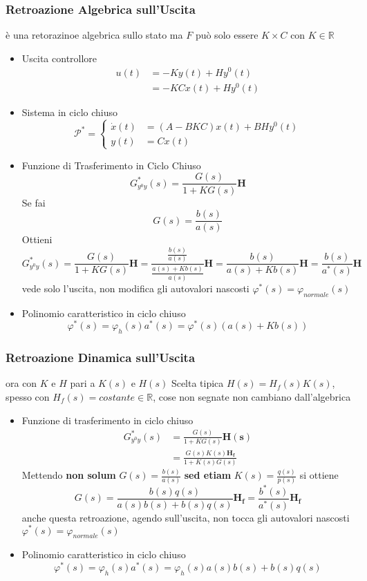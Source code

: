 \documentclass{article}
\begin{document}
\subsubsection{Retroazione Algebrica sull'Uscita}
è una retorazinoe algebrica sullo stato ma $F$ può solo essere
$K \times C$ con $K \in \mathbb{R}$
\begin{itemize}
\item Uscita controllore
  \begin{align*}
    u(t) &= -Ky(t) + H y^0 (t) \\
    &= -KCx(t) + Hy^0 (t)
  \end{align*}
\item Sistema in ciclo chiuso
  \[ \mathcal{P}^{\ast} = \begin{cases}
    \dot{x}(t) &= (A-BKC)x(t) + BHy^0 (t) \\
    y(t) &= Cx(t)
  \end{cases} \]
\item Funzione di Trasferimento in Ciclo Chiuso
  \[ G^{\ast} _{y^0 y} (s) = \frac{G(s)}{1+ KG(s)} \mathbf{H}\]
  Se fai
  \[ G(s) = \frac{b(s)}{a(s)} \]
  Ottieni
  \[ G^{\ast} _{y^0 y} (s)
  = \frac{G(s)}{1+KG(s)} \mathbf{H}
  = \frac{\frac{b(s)}{a(s)}}{\frac{a(s) + Kb(s)}{a(s)}} \mathbf{H}
  = \frac{b(s)}{a(s) + Kb(s)} \mathbf{H}
  = \frac{b(s)}{a^{\ast}(s)} \mathbf{H}\]
  vede solo l'uscita, non modifica gli autovalori nascosti
  $\varphi ^{\ast} (s) = \varphi_{normale} (s)$ \item Polinomio caratteristico in ciclo chiuso
  \[ \varphi ^{\ast} (s) = \varphi_{h} (s) a^{\ast} (s)
  = \varphi ^{\ast} (s) (a(s) + Kb(s)) \]
\end{itemize}

\subsubsection{Retroazione Dinamica sull'Uscita}
ora con $K$ e $H$ pari a $K(s)$ e $H(s)$
Scelta tipica $H(s) = H_f (s) K(s)$, spesso con
$H_f (s) = costante \in \mathbb{R}$, cose non segnate non cambiano
dall'algebrica

\begin{itemize}
\item Funzione di trasferimento in ciclo chiuso
  \begin{align*}
    G^{\ast} _{y^0 y}(s) &= \frac{G(s)}{1 + KG(s)} \mathbf{H(s)} \\
    &= \frac{G(s)K(s) \mathbf{H_f}}{1 + K(s)G(s)}
  \end{align*}
  Mettendo \textbf{non solum}
  $G(s) = \frac{b(s)}{a(s)}$ \textbf{sed etiam}
  $K(s) = \frac{q(s)}{p(s)}$ si ottiene
  \[ G(s) = \frac{b(s)q(s)}{a(s)b(s) + b(s)q(s)} \mathbf{H_f} =
  \frac{b^{\ast}(s)}{a^{\ast}(s)} \mathbf{H_f} \]
  anche questa retroazione, agendo sull'uscita, non tocca gli autovalori nascosti
  $\varphi ^{\ast} (s) = \varphi_{normale} (s)$
\item Polinomio caratteristico in ciclo chiuso
  \[ \varphi ^{\ast} (s) = \varphi_h (s) a^{\ast} (s)
  = \varphi _h (s) a(s)b(s) + b(s)q(s) \]
\end{itemize}
\end{document}
